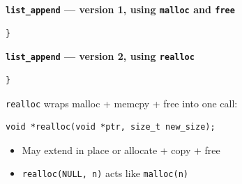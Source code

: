 \documentclass[oneside, landscape]{article}
\begin{document}
\begin{minipage}[t]{0.45\textwidth}

\textbf{\texttt{list\_append} --- version 1, using \texttt{malloc} and \texttt{free}}

\vspace{0.5em}

%
\vspace{8\baselineskip}%
\begin{lstlisting}[basicstyle=\ttfamily\footnotesize, numbers=none]
}
\end{lstlisting}

\vspace{3em}

\textbf{\texttt{list\_append} --- version 2, using \texttt{realloc}}

\vspace{0.5em}

%
\vspace{5\baselineskip}%
\begin{lstlisting}[basicstyle=\ttfamily\footnotesize, numbers=none]
}
\end{lstlisting}

\vspace{1em}

\texttt{realloc} wraps malloc + memcpy + free into one call:

\begin{lstlisting}[basicstyle=\ttfamily\footnotesize, numbers=none]
void *realloc(void *ptr, size_t new_size);
\end{lstlisting}

\vspace{-0.5em}

\begin{itemize} \itemsep0em
  \item May extend in place or allocate + copy + free
  \item \texttt{realloc(NULL, n)} acts like \texttt{malloc(n)}
\end{itemize}

\end{minipage}

\newpage

\end{document}
